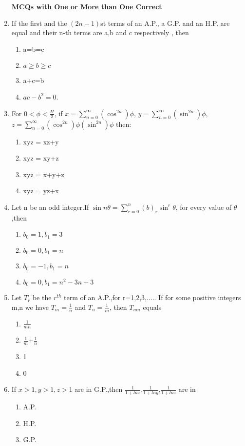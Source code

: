 \begin{enumerate}[label=\arabic*.,ref=\thesubsection.\theenumi]
\textbf{MCQs with One or More than One Correct}

\item If the first and the $(2n-1)$st terms of an A.P., a G.P. and an H.P. are equal and their n-th terms are a,b and c respectively , then
\begin{enumerate}
\item a=b=c 
\item $a \geq b \geq c$   
\item a+c=b 
\item $ac-b^2=0$.
\end{enumerate}
\item For $0<\phi<\frac{\Pi}{2}$, if $x=\sum_{n=0}^{\infty}(\cos^{2n})\phi$, $y=\sum_{n=0}^{\infty}(\sin^{2n})\phi$, $z=\sum_{n=0}^{\infty}(\cos^{2n})\phi(\sin^{2n})\phi$ then:
\begin{enumerate}
\item xyz = xz+y 
\item xyz = xy+z 
\item xyz = x+y+z 
\item xyz = yz+x
\end{enumerate}
\item Let n be an odd integer.If $\sin n\theta=\sum_{r=0}^{n}(b)_r \sin^r\theta$, for every value of $\theta$,then 
\begin{enumerate}
\item $b_0=1, b_1=3$ 
\item $b_0=0, b_1=n$ 
\item $b_0=-1, b_1=n$ 
\item $b_0=0, b_1=n^2-3n+3$
\end{enumerate}
\item Let $T_r$ be the $r^{th}$ term of an A.P.,for r=1,2,3,..... If for some positive integers m,n we have $T_m=\frac{1}{n}$ and $T_n=\frac{1}{m}$, then $T_{mn}$ equals
\begin{enumerate}
\item $\frac{1}{mn}$ 
\item $\frac{1}{m}$+$\frac{1}{n}$ 
\item 1 
\item 0
\end{enumerate}
\item If $x>1, y>1, z>1$ are in G.P.,then $\frac{1}{1+ln x}$,$\frac{1}{1+ln y}$,$\frac{1}{1+ln z}$ are in 
\begin{enumerate}
\item A.P. 
\item H.P. 
\item G.P. 

\end{enumerate}
\end{enumerate}
